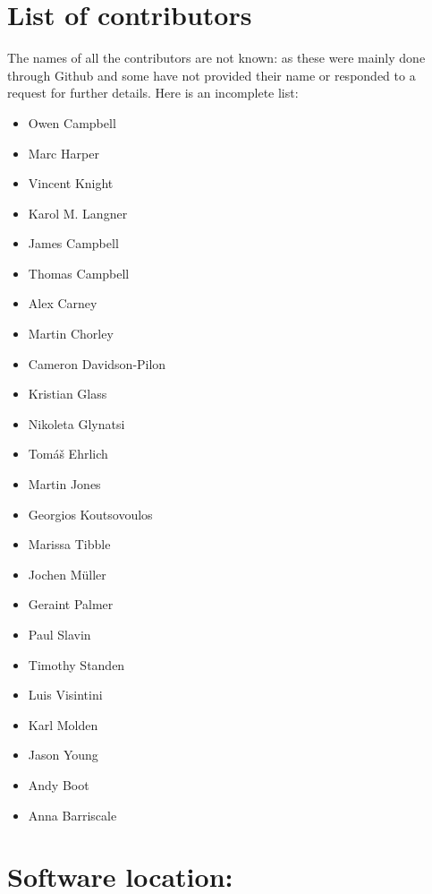 \documentclass{jors}
\begin{document}
\section*{List of contributors}

The names of all the contributors are not known: as these were mainly done
through Github and some have not provided their name or responded to a
request for further details. Here is an incomplete list:

\begin{multicols}{2}
    \begin{itemize}[noitemsep,topsep=0pt]
        \item {Owen Campbell}
        \item {Marc Harper}
        \item {Vincent Knight}
        \item {Karol M. Langner}
        \item {James Campbell}
        \item {Thomas Campbell}
        \item {Alex Carney}
        \item {Martin Chorley}
        \item {Cameron Davidson-Pilon}
        \item {Kristian Glass}
        \item {Nikoleta Glynatsi}
        \item {Tom{\'a}{\v s} Ehrlich}
        \item {Martin Jones}
        \item {Georgios Koutsovoulos}
        \item {Marissa Tibble}
        \item {Jochen M{\"u}ller}
        \item {Geraint Palmer}
        \item {Paul Slavin}
        \item {Timothy Standen}
        \item {Luis Visintini}
        \item {Karl Molden}
        \item {Jason Young}
        \item {Andy Boot}
        \item {Anna Barriscale}
    \end{itemize}
\end{multicols}

\section*{Software location:}
\end{document}
